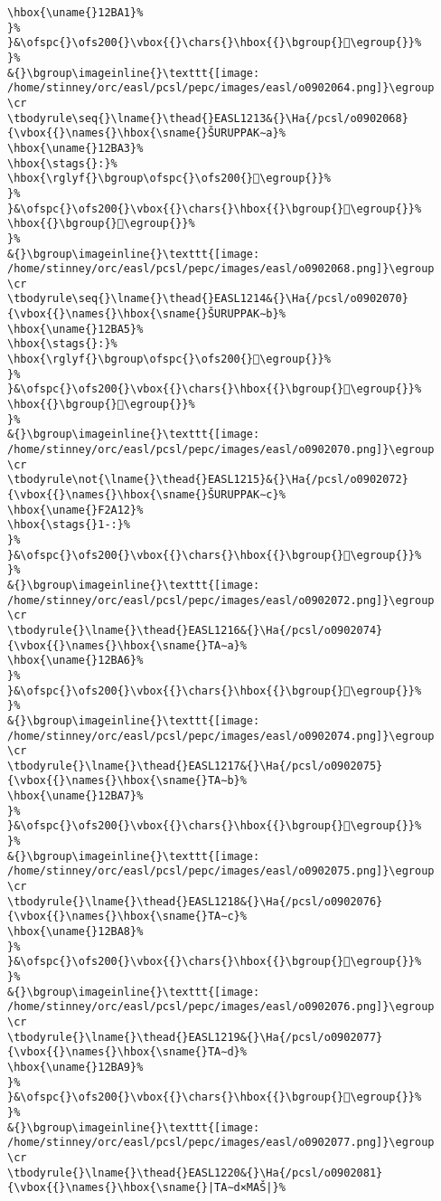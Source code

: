 \begin{verbatim}
\hbox{\uname{}12BA1}%
}%
}&\ofspc{}\ofs200{}\vbox{{}\chars{}\hbox{{}\bgroup{}𒮡\egroup{}}%
}%
&{}\bgroup\imageinline{}\texttt{[image: /home/stinney/orc/easl/pcsl/pepc/images/easl/o0902064.png]}\egroup
\cr
\tbodyrule\seq{}\lname{}\thead{}EASL1213&{}\Ha{/pcsl/o0902068}{\vbox{{}\names{}\hbox{\sname{}ŠURUPPAK∼a}%
\hbox{\uname{}12BA3}%
\hbox{\stags{}:}%
\hbox{\rglyf{}\bgroup\ofspc{}\ofs200{}𒮣\egroup{}}%
}%
}&\ofspc{}\ofs200{}\vbox{{}\chars{}\hbox{{}\bgroup{}𒮢\egroup{}}%
\hbox{{}\bgroup{}𒮣\egroup{}}%
}%
&{}\bgroup\imageinline{}\texttt{[image: /home/stinney/orc/easl/pcsl/pepc/images/easl/o0902068.png]}\egroup
\cr
\tbodyrule\seq{}\lname{}\thead{}EASL1214&{}\Ha{/pcsl/o0902070}{\vbox{{}\names{}\hbox{\sname{}ŠURUPPAK∼b}%
\hbox{\uname{}12BA5}%
\hbox{\stags{}:}%
\hbox{\rglyf{}\bgroup\ofspc{}\ofs200{}𒮥\egroup{}}%
}%
}&\ofspc{}\ofs200{}\vbox{{}\chars{}\hbox{{}\bgroup{}𒮤\egroup{}}%
\hbox{{}\bgroup{}𒮥\egroup{}}%
}%
&{}\bgroup\imageinline{}\texttt{[image: /home/stinney/orc/easl/pcsl/pepc/images/easl/o0902070.png]}\egroup
\cr
\tbodyrule\not{\lname{}\thead{}EASL1215}&{}\Ha{/pcsl/o0902072}{\vbox{{}\names{}\hbox{\sname{}ŠURUPPAK∼c}%
\hbox{\uname{}F2A12}%
\hbox{\stags{}1-:}%
}%
}&\ofspc{}\ofs200{}\vbox{{}\chars{}\hbox{{}\bgroup{}󲨒\egroup{}}%
}%
&{}\bgroup\imageinline{}\texttt{[image: /home/stinney/orc/easl/pcsl/pepc/images/easl/o0902072.png]}\egroup
\cr
\tbodyrule{}\lname{}\thead{}EASL1216&{}\Ha{/pcsl/o0902074}{\vbox{{}\names{}\hbox{\sname{}TA∼a}%
\hbox{\uname{}12BA6}%
}%
}&\ofspc{}\ofs200{}\vbox{{}\chars{}\hbox{{}\bgroup{}𒮦\egroup{}}%
}%
&{}\bgroup\imageinline{}\texttt{[image: /home/stinney/orc/easl/pcsl/pepc/images/easl/o0902074.png]}\egroup
\cr
\tbodyrule{}\lname{}\thead{}EASL1217&{}\Ha{/pcsl/o0902075}{\vbox{{}\names{}\hbox{\sname{}TA∼b}%
\hbox{\uname{}12BA7}%
}%
}&\ofspc{}\ofs200{}\vbox{{}\chars{}\hbox{{}\bgroup{}𒮧\egroup{}}%
}%
&{}\bgroup\imageinline{}\texttt{[image: /home/stinney/orc/easl/pcsl/pepc/images/easl/o0902075.png]}\egroup
\cr
\tbodyrule{}\lname{}\thead{}EASL1218&{}\Ha{/pcsl/o0902076}{\vbox{{}\names{}\hbox{\sname{}TA∼c}%
\hbox{\uname{}12BA8}%
}%
}&\ofspc{}\ofs200{}\vbox{{}\chars{}\hbox{{}\bgroup{}𒮨\egroup{}}%
}%
&{}\bgroup\imageinline{}\texttt{[image: /home/stinney/orc/easl/pcsl/pepc/images/easl/o0902076.png]}\egroup
\cr
\tbodyrule{}\lname{}\thead{}EASL1219&{}\Ha{/pcsl/o0902077}{\vbox{{}\names{}\hbox{\sname{}TA∼d}%
\hbox{\uname{}12BA9}%
}%
}&\ofspc{}\ofs200{}\vbox{{}\chars{}\hbox{{}\bgroup{}𒮩\egroup{}}%
}%
&{}\bgroup\imageinline{}\texttt{[image: /home/stinney/orc/easl/pcsl/pepc/images/easl/o0902077.png]}\egroup
\cr
\tbodyrule{}\lname{}\thead{}EASL1220&{}\Ha{/pcsl/o0902081}{\vbox{{}\names{}\hbox{\sname{}|TA∼d×MAŠ|}%

\end{verbatim}
